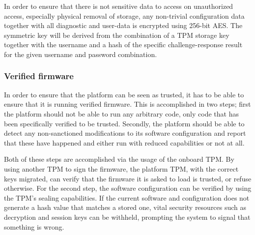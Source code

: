 \documentclass[10pt]{article}
\begin{document}
        In order to ensure that there is not sensitive data to access on
        unauthorized access, especially physical removal of storage, any
        non-trivial configuration data together with all diagnostic and
        user-data is encrypted using 256-bit AES. The symmetric key will be
        derived from the combination of a TPM storage key together with the
        username and a hash of the specific challenge-response result for the
        given username and password combination.

      \subsubsection{Verified firmware}

        In order to ensure that the platform can be seen as trusted, it has to
        be able to ensure that it is running verified firmware. This is
        accomplished in two steps; first the platform should not be able to run
        any arbitrary code, only code that has been specifically verified to be
        trusted. Secondly, the platform should be able to detect any
        non-sanctioned modifications to its software configuration and report
        that these have happened and either run with reduced capabilities or
        not at all.

        Both of these steps are accomplished via the usage of the onboard TPM.
        By using another TPM to sign the firmware, the platform TPM, with
        the correct keys migrated, can verify that the firmware it is asked to
        load is trusted, or refuse otherwise. For the second step, the software
        configuration can be verified by using the TPM's sealing capabilities.
        If the current software and configuration does not generate a hash
        value that matches a stored one, vital security resources such as
        decryption and session keys can be withheld, prompting the system to
        signal that something is wrong.
\end{document}
